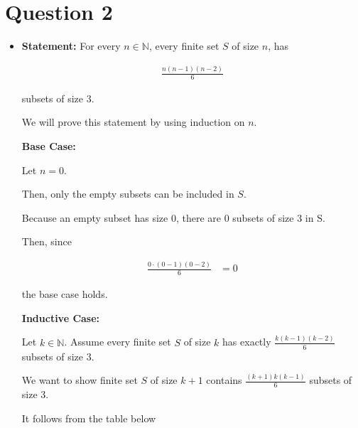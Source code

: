 \documentclass[12pt]{article}
\begin{document}
\section*{Question 2}
\begin{itemize}
    \item

    \textbf{Statement:} For every $n \in \mathbb{N}$, every finite set $S$ of size $n$,
    has

    \setcounter{equation}{0}
    \begin{align}
        \frac{n(n-1)(n-2)}{6}
    \end{align}

    subsets of size 3.

    \bigskip

    We will prove this statement by using induction on $n$.

    \bigskip

    \textbf{Base Case:}

    \bigskip

    Let $n = 0$.

    \bigskip

    Then, only the empty subsets can be included in $S$.

    \bigskip

    Because an empty subset has size 0, there are 0 subsets of size 3 in S.

    \bigskip

    Then, since

    \begin{align}
        \frac{0 \cdot (0-1)(0-2)}{6} &= 0
    \end{align}

    the base case holds.

    \bigskip

    \textbf{Inductive Case:}

    \bigskip

    Let $k \in \mathbb{N}$. Assume every finite set $S$ of size $k$ has exactly
    $\frac{k(k-1)(k-2)}{6}$ subsets of size 3.

    \bigskip

    We want to show finite set $S$ of size $k+1$ contains $\frac{(k+1)k(k-1)}{6}$
    subsets of size 3.

    \bigskip

    It follows from the table below

    \bigskip


\end{itemize}
\end{document}
